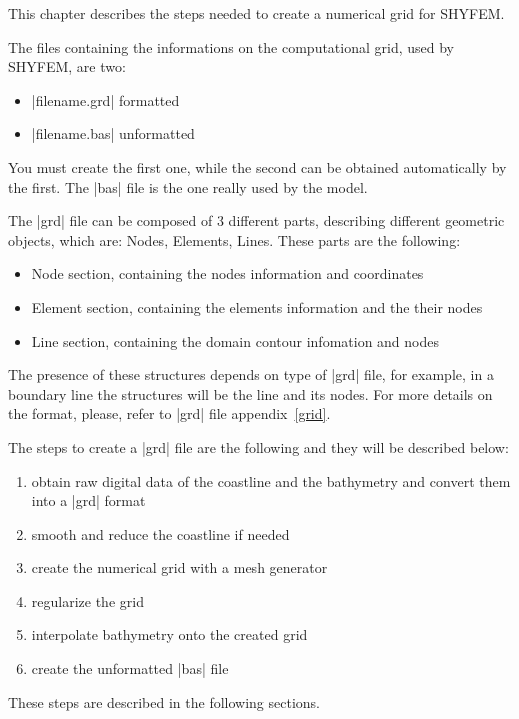 This chapter describes the steps needed to create a numerical grid for SHYFEM.

The files containing the informations on the computational grid, used by SHYFEM, are two:

\begin{itemize}
\item |filename.grd| formatted
\item |filename.bas| unformatted
\end{itemize}

You must create the first one, while the second can be obtained automatically by
the first. The |bas| file is the one really used by the model.

The |grd| file can be composed of 3 different parts, describing different geometric
objects, which are: Nodes, Elements, Lines. These parts are the following:

\begin{itemize}
\item Node section, containing the nodes information and coordinates
\item Element section, containing the elements information and the their nodes
\item Line section, containing the domain contour infomation and nodes
\end{itemize}

The presence of these structures depends on type of |grd| file, for example,
in a boundary line the structures will be the line and its nodes.
For more details on the format, please, refer to |grd| file appendix~\ref{grid}.

The steps to create a |grd| file are the following and they will be described below:

\begin{enumerate}

\item obtain raw digital data of the coastline and the bathymetry and
  convert them into a |grd| format

\item smooth and reduce the coastline if needed

\item create the numerical grid with a mesh generator

\item regularize the grid

\item interpolate bathymetry onto the created grid

\item create the unformatted |bas| file

\end{enumerate}

These steps are described in the following sections.

